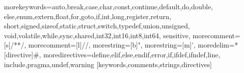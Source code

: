 

%
  {morekeywords={auto,break,case,char,const,continue,default,do,double,%
      else,enum,extern,float,for,goto,if,int,long,register,return,%
      short,signed,sizeof,static,struct,switch,typedef,union,unsigned,%
      void,volatile,while,sync,shared,int32,int16,int8,int64},%
  sensitive,%
  morecomment=[s]{/*}{*/},%
  morecomment=[l]//,%
  morestring=[b]",%
  morestring=[m]',%
  moredelim=*[directive]\#,%
  moredirectives={define,elif,else,endif,error,if,ifdef,ifndef,line,%
  include,pragma,undef,warning}%
}[keywords,comments,strings,directives]%


